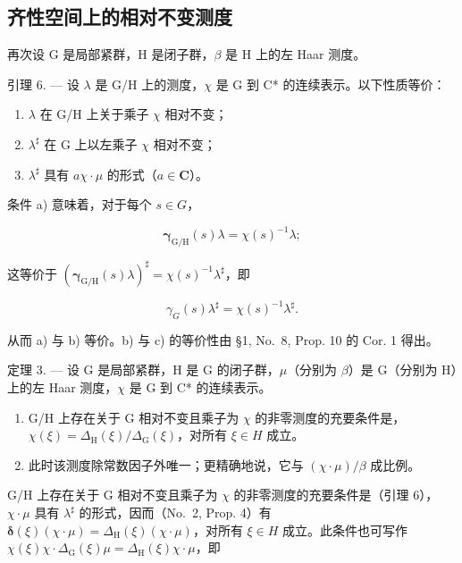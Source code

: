 \subsection{齐性空间上的相对不变测度}

再次设 G 是局部紧群，H 是闭子群，\(\beta\) 是 H 上的左 Haar 测度。

引理 6. --- 设 \(\lambda\) 是 G/H 上的测度，\(\chi\) 是 G 到 C* 的连续表示。以下性质等价：

\begin{enumerate}
\def\labelenumi{\alph{enumi})}
\item
  \(\lambda\) 在 G/H 上关于乘子 \(\chi\) 相对不变；
\item
  \(\lambda^{\sharp}\) 在 G 上以左乘子 \(\chi\) 相对不变；
\item
  \(\lambda^{\sharp}\) 具有 \(a\chi \cdot \mu\) 的形式（\(a \in \mathbf{C}\)）。
\end{enumerate}

条件 a) 意味着，对于每个 \(s \in G\)，

\[
\pmb {\gamma} _ {\mathrm{G/H}} (s) \lambda = \chi (s) ^ {- 1} \lambda ;
\]

这等价于 \(\left(\pmb{\gamma}_{\mathrm{G / H}}(s)\lambda\right)^{\sharp} = \chi (s)^{-1}\lambda^{\sharp}\)，即

\[
\gamma_ {G} (s) \lambda^ {\sharp} = \chi (s) ^ {- 1} \lambda^ {\sharp}.
\]

从而 a) 与 b) 等价。b) 与 c) 的等价性由 §1, No.~8, Prop. 10 的 Cor. 1 得出。

定理 3. --- 设 G 是局部紧群，H 是 G 的闭子群，\(\mu\)（分别为 \(\beta\)）是 G（分别为 H）上的左 Haar 测度，\(\chi\) 是 G 到 C* 的连续表示。

\begin{enumerate}
\def\labelenumi{\alph{enumi})}
\item
G/H 上存在关于 G 相对不变且乘子为 \(\chi\) 的非零测度的充要条件是，\(\chi(\xi)=\Delta_{\mathrm{H}}(\xi)/\Delta_{\mathrm{G}}(\xi)\)，对所有 \(\xi\in H\) 成立。
\item
  此时该测度除常数因子外唯一；更精确地说，它与 \((\chi \cdot \mu) / \beta\) 成比例。
\end{enumerate}

G/H 上存在关于 G 相对不变且乘子为 \(\chi\) 的非零测度的充要条件是（引理 6），\(\chi\cdot\mu\) 具有 \(\lambda^{\sharp}\) 的形式，因而（No.~2, Prop. 4）有 \(\boldsymbol{\delta}(\xi)(\chi\cdot\mu)=\Delta_{\mathrm{H}}(\xi)(\chi\cdot\mu)\)，对所有 \(\xi\in H\) 成立。此条件也可写作 \(\chi(\xi)\chi\cdot\Delta_{\mathrm{G}}(\xi)\mu=\Delta_{\mathrm{H}}(\xi)\chi\cdot\mu\)，即

